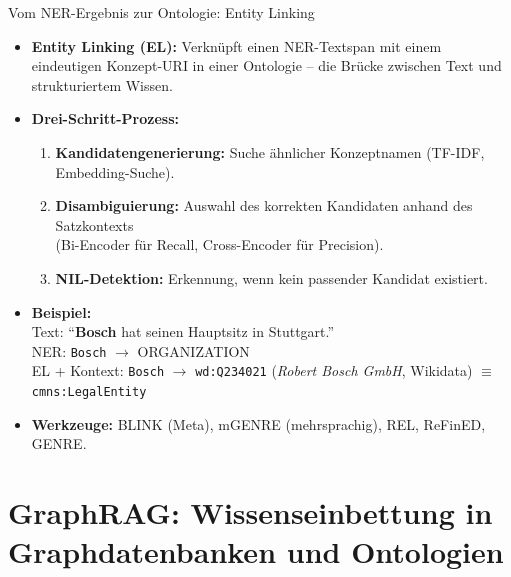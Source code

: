 \documentclass[aspectratio=1610, xcolor=dvipsnames, 9pt]{beamer}
\begin{document}
\begin{frame}{Vom NER-Ergebnis zur Ontologie: Entity Linking}
  \begin{itemize}
    \item \textbf{Entity Linking (EL):} Verknüpft einen NER-Textspan mit einem eindeutigen Konzept-URI in einer Ontologie -- die Brücke zwischen Text und strukturiertem Wissen.
    \item \textbf{Drei-Schritt-Prozess:}
      \begin{enumerate}
        \item \textbf{Kandidatengenerierung:} Suche ähnlicher Konzeptnamen (TF-IDF, Embedding-Suche).
        \item \textbf{Disambiguierung:} Auswahl des korrekten Kandidaten anhand des Satzkontexts\\
          (Bi-Encoder für Recall, Cross-Encoder für Precision).
        \item \textbf{NIL-Detektion:} Erkennung, wenn kein passender Kandidat existiert.
      \end{enumerate}
    \vspace{0.2cm}
    \item \textbf{Beispiel:}\\
      Text: ``\textbf{Bosch} hat seinen Hauptsitz in Stuttgart.''\\
      NER: \texttt{Bosch} $\rightarrow$ ORGANIZATION\\
      EL + Kontext: \texttt{Bosch} $\rightarrow$ \texttt{wd:Q234021} (\textit{Robert Bosch GmbH}, Wikidata) $\equiv$ \texttt{cmns:LegalEntity}
    \item \textbf{Werkzeuge:} BLINK (Meta), mGENRE (mehrsprachig), REL, ReFinED, GENRE.
  \end{itemize}
\end{frame}

\section{GraphRAG: Wissenseinbettung in Graphdatenbanken und Ontologien}
\end{document}
